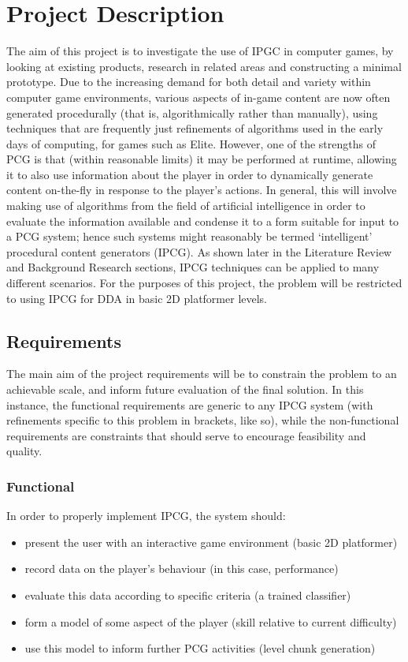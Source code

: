 \documentclass[a4paper,oneside,12pt,openany]{memoir}
\begin{document}
\tableofcontents*
\mainmatter
\chapter{Project Description}
The aim of this project is to investigate the use of IPGC in computer games, by looking at existing products, research in related areas and constructing a minimal prototype. Due to the increasing demand for both detail and variety within computer game environments, various aspects of in-game content are now often generated procedurally (that is, algorithmically rather than manually), using techniques that are frequently just refinements of algorithms used in the early days of computing, for games such as Elite\cite{elite}.
However, one of the strengths of PCG is that (within reasonable limits) it may be performed at runtime, allowing it to also use information about the player in order to dynamically generate content on-the-fly in response to the player's actions. In general, this will involve making use of algorithms from the field of artificial intelligence in order to evaluate the information available and condense it to a form suitable for input to a PCG system; hence such systems might reasonably be termed `intelligent' procedural content generators (IPCG).
As shown later in the Literature Review and Background Research sections, IPCG techniques can be applied to many different scenarios. For the purposes of this project, the problem will be restricted to using IPCG for DDA in basic 2D platformer levels. 

\section{Requirements}
The main aim of the project requirements will be to constrain the problem to an achievable scale, and inform future evaluation of the final solution. In this instance, the functional requirements are generic to any IPCG system (with refinements specific to this problem in brackets, like so), while the non-functional requirements are constraints that should serve to encourage feasibility and quality.

\subsection{Functional}
In order to properly implement IPCG, the system should:
\begin{itemize}[-]
\item present the user with an interactive game environment (basic 2D platformer)
\item record data on the player's behaviour (in this case, performance)
\item evaluate this data according to specific criteria (a trained classifier)
\item form a model of some aspect of the player (skill relative to current difficulty)
\item use this model to inform further PCG activities (level chunk generation)
\end{itemize}
\end{document}
